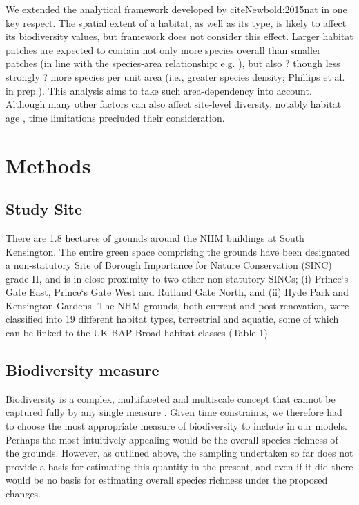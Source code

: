 We extended the analytical framework developed by cite{Newbold:2015nat} in one key respect. The spatial extent of a habitat, as well as its type, is likely to affect its biodiversity values, but \cite{Newbold:2015nat} framework does not consider this effect.  Larger habitat patches are expected to contain not only more species overall than smaller patches (in line with the species-area relationship: e.g. \citealt{rosenzweig:1995species}), but also ? though less strongly ? more species per unit area (i.e., greater species density; Phillips et al. in prep.). This analysis aims to take such area-dependency into account. Although many other factors can also affect site-level diversity, notably habitat age \citep{Sattler:2010le}, time limitations precluded their consideration.


\section{Methods}
\subsection{Study Site}
There are 1.8 hectares of grounds around the NHM buildings at South Kensington. The entire green space comprising the grounds have been designated a non-statutory Site of Borough Importance for Nature Conservation (SINC) grade II, and is in close proximity to two other non-statutory SINCs; (i) Prince`s Gate East, Prince`s Gate West and Rutland Gate North, and (ii) Hyde Park and Kensington Gardens. The NHM grounds, both current and post renovation, were classified into 19 different habitat types, terrestrial and aquatic, some of which can be linked to the UK BAP Broad habitat classes (Table 1).

\subsection{Biodiversity measure}
Biodiversity is a complex, multifaceted and multiscale concept that cannot be captured fully by any single measure \citep{Purvis:2000nat}. Given time constraints, we therefore had to choose the most appropriate measure of biodiversity to include in our models. Perhaps the most intuitively appealing would be the overall species richness of the grounds. However, as outlined above, the sampling undertaken so far does not provide a basis for estimating this quantity in the present, and even if it did there would be no basis for estimating overall species richness under the proposed changes.

